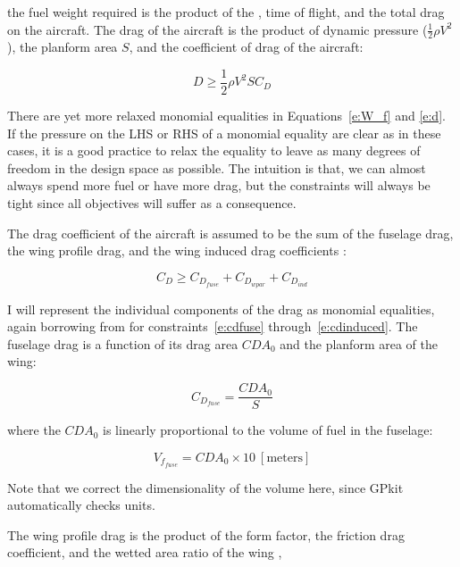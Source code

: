 the fuel weight required is the product of the \BSFC, time of flight, and the
total drag on the aircraft.
The drag of the aircraft is the product of dynamic pressure ($\frac{1}{2} \rho V^2$),
the planform area $S$, and the coefficient of drag of the aircraft:

\begin{equation}
    D \geq \frac{1}{2} \rho V^2 S C_D
    \label{e:d}
\end{equation}

There are yet more relaxed monomial equalities in Equations~\ref{e:W_f} and \ref{e:d}.
If the pressure on the \gls{LHS} or \gls{RHS} of a monomial equality are clear as in these cases,
it is a good practice to relax the equality to leave as many degrees of freedom
in the design space as possible. The intuition is that, we can almost always spend more fuel or have more drag,
but the constraints will always be tight since all objectives will suffer as a consequence.

The drag coefficient of the aircraft is assumed to be the sum of the fuselage drag,
the wing profile drag, and the wing induced drag coefficients \cite{gp_ac_design}:

\begin{equation}
    C_D \geq C_{D_{fuse}} + C_{D_{wpar}} + C_{D_{ind}}
\label{e:cd}
\end{equation}

I will represent the individual components of the drag as monomial equalities, again borrowing
from \cite{gp_ac_design} for constraints~\ref{e:cdfuse} through~\ref{e:cdinduced}.
The fuselage drag is a function of its drag area $CDA_0$ and the planform area of the wing:

\begin{equation}
    C_{D_{fuse}} = \frac{CDA_0}{S}
\label{e:cdfuse}
\end{equation}

where the $CDA_0$ is linearly proportional to the volume of fuel in the fuselage:

\begin{equation}
    V_{f_{fuse}} = CDA_0 \times 10 ~\mathrm{[meters]}
\label{e:vffuse}
\end{equation}

Note that we correct the dimensionality of the volume here, since GPkit automatically checks units.

The wing profile drag is the product of the form factor, the friction drag coefficient,
and the wetted area ratio of the wing \cite{gp_ac_design},

